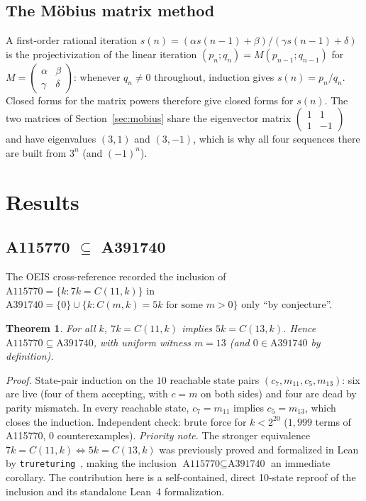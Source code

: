 \documentclass[11pt]{article}
\newtheorem{theorem}{Theorem}[section]
\newcommand{\clmul}{C} %
\begin{document}
\subsection{The M\"obius matrix method}
A first-order rational iteration $s(n) = (\alpha s(n-1) +
\beta)/(\gamma s(n-1) + \delta)$ is the projectivization of the
linear iteration $(p_n; q_n) = M (p_{n-1}; q_{n-1})$ for
$M = \begin{pmatrix} \alpha & \beta \\ \gamma & \delta
\end{pmatrix}$: whenever $q_n \ne 0$ throughout, induction gives
$s(n) = p_n/q_n$. Closed forms for the matrix powers therefore
give closed forms for $s(n)$. The two matrices of
Section~\ref{sec:mobius} share the eigenvector matrix
$\begin{pmatrix} 1 & 1 \\ 1 & -1 \end{pmatrix}$ and have
eigenvalues $(3, 1)$ and $(3, -1)$, which is why all four
sequences there are built from $3^n$ (and $(-1)^n$).

\section{Results}
\label{sec:results}

\subsection{A115770 $\subseteq$ A391740}
\label{sec:a115770}
The OEIS cross-reference recorded the inclusion of
$\mathrm{A115770} = \{k : 7k = \clmul(11,k)\}$ in
$\mathrm{A391740} = \{0\} \cup \{k : \clmul(m,k) = 5k \text{ for some }
m > 0\}$ only ``by conjecture''.

\begin{theorem}
For all $k$, $7k = \clmul(11,k)$ implies $5k = \clmul(13,k)$. Hence
$\mathrm{A115770} \subseteq \mathrm{A391740}$, with uniform witness
$m = 13$ (and $0 \in \mathrm{A391740}$ by definition).
\end{theorem}

\emph{Proof.} State-pair induction on the $10$ reachable state
pairs $(c_7, m_{11}, c_5, m_{13})$: six are live (four of them
accepting, with $c = m$ on both sides) and four are dead by parity
mismatch. In every reachable state, $c_7 = m_{11}$ implies
$c_5 = m_{13}$, which closes the induction.
Independent check: brute force for $k < 2^{20}$ ($1{,}999$ terms of
A115770, $0$ counterexamples).
\emph{Priority note.} The stronger equivalence $7k = C(11,k) \iff 5k = C(13,k)$ was previously proved and formalized in Lean by \texttt{trureturing}~\cite{trureturing2026}, making the inclusion $\text{A115770} \subseteq \text{A391740}$ an immediate corollary. The contribution here is a self-contained, direct 10-state reproof of the inclusion and its standalone Lean~4 formalization.
\end{document}
